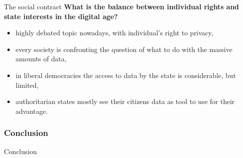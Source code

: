 \documentclass[xcolor=table]{beamer}
\begin{document}
\begin{frame}{The social contract}
\textbf{What is the balance between individual rights and state interests in the digital age?}
\begin{itemize}
\item highly debated topic nowadays, with individual's right to privacy,
\item every society is confronting the question of what to do with the massive amounts of data,
\item in liberal democracies the access to data by the state is considerable, but limited,
\item authoritarian states mostly see their citizens data as tool to use for their advantage.
\end{itemize}
\end{frame}



\begin{frame}
\frametitle{Conclusion}
\Huge{\centerline{Conclusion}}
\end{frame}
\end{document}
